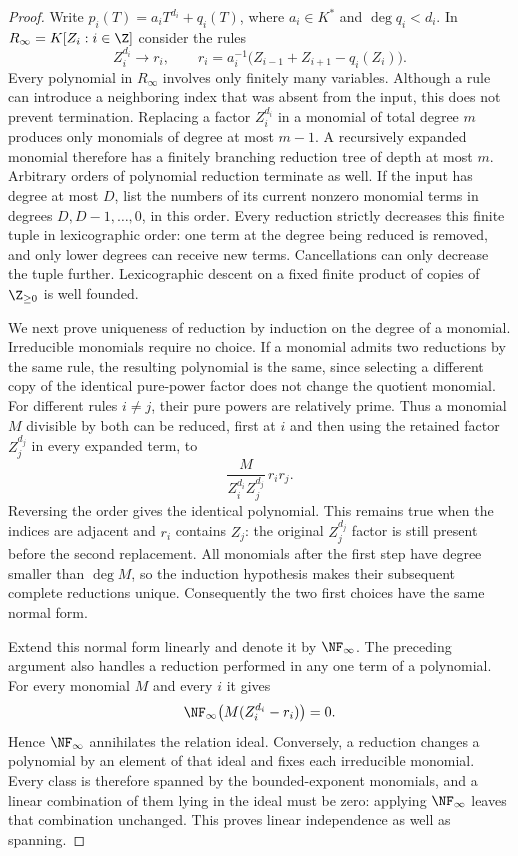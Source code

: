 \begin{proof}
Write $p_i(T)=a_iT^{d_i}+q_i(T)$, where $a_i\in K^*$ and
$\deg q_i<d_i$.  In $R_\infty=K[Z_i:i\in\Z]$ consider the rules
\begin{equation}
  Z_i^{d_i}\longrightarrow r_i,
  \qquad
  r_i=a_i^{-1}\bigl(Z_{i-1}+Z_{i+1}-q_i(Z_i)\bigr).
  \label{eq:pure-power-rewrite}
\end{equation}
Every polynomial in $R_\infty$ involves only finitely many variables.
Although a rule can introduce a neighboring index that was absent from the
input, this does not prevent termination.  Replacing a factor $Z_i^{d_i}$
in a monomial of total degree $m$ produces only monomials of degree at most
$m-1$.  A recursively expanded monomial therefore has a finitely branching
reduction tree of depth at most $m$.  Arbitrary orders of polynomial
reduction terminate as well.  If the input has degree at most $D$, list the
numbers of its current nonzero monomial terms in degrees
$D,D-1,\ldots,0$, in this order.  Every reduction strictly decreases this
finite tuple in lexicographic order: one term at the degree being reduced
is removed, and only lower degrees can receive new terms.  Cancellations
can only decrease the tuple further.  Lexicographic descent on a fixed
finite product of copies of $\Z_{\ge0}$ is well founded.

We next prove uniqueness of reduction by induction on the degree of a
monomial.  Irreducible monomials require no choice.  If a monomial admits
two reductions by the same rule, the resulting polynomial is the same,
since selecting a different copy of the identical pure-power factor
does not change the quotient monomial.  For different rules $i\ne j$,
their pure powers are relatively prime.  Thus a monomial $M$ divisible
by both can be reduced, first at $i$ and then using the retained factor
$Z_j^{d_j}$ in every expanded term, to
\begin{equation}
  \frac{M}{Z_i^{d_i}Z_j^{d_j}}\,r_ir_j.
  \label{eq:common-multiple-reduction}
\end{equation}
Reversing the order gives the identical polynomial.  This remains true
when the indices are adjacent and $r_i$ contains $Z_j$: the original
$Z_j^{d_j}$ factor is still present before the second replacement.
All monomials after the first step have degree smaller than $\deg M$,
so the induction hypothesis makes their subsequent complete reductions
unique.  Consequently the two first choices have the same normal form.

Extend this normal form linearly and denote it by $\NF_\infty$.
The preceding argument also handles a reduction performed in any one
term of a polynomial.  For every monomial $M$ and every $i$ it gives
\[
  \NF_\infty\bigl(M(Z_i^{d_i}-r_i)\bigr)=0.
\]
Hence $\NF_\infty$ annihilates the relation ideal.  Conversely, a
reduction changes a polynomial by an element of that ideal and fixes
each irreducible monomial.  Every class is therefore spanned by the
bounded-exponent monomials, and a linear combination of them lying in
the ideal must be zero: applying $\NF_\infty$ leaves that combination
unchanged.  This proves linear independence as well as spanning.


\end{proof}
